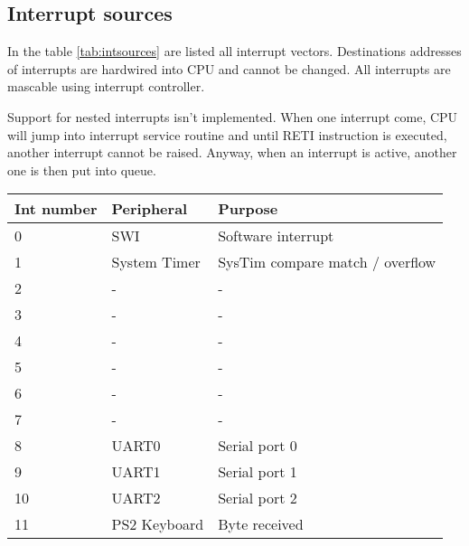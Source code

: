\subsection{Interrupt sources}

In the table \ref{tab:intsources} are listed all interrupt vectors. Destinations
addresses of interrupts are hardwired into CPU and cannot be changed. All
interrupts are mascable using interrupt controller.

Support for nested interrupts isn't implemented. When one interrupt come, CPU
will jump into interrupt service routine and until RETI instruction is executed,
another interrupt cannot be raised. Anyway, when an interrupt is active, another
one is then put into queue.

\begin{table}[h]
    \centering
    \begin{tabular}{|l|l|l|}
        \hline
        \textbf{Int number} & \textbf{Peripheral} & \textbf{Purpose}                \\ \hline
        0                   & SWI                 & Software interrupt              \\ \hline
        1                   & System Timer        & SysTim compare match / overflow \\ \hline
        2                   & -                   & -                               \\ \hline
        3                   & -                   & -                               \\ \hline
        4                   & -                   & -                               \\ \hline
        5                   & -                   & -                               \\ \hline
        6                   & -                   & -                               \\ \hline
        7                   & -                   & -                               \\ \hline
        8                   & UART0               & Serial port 0                   \\ \hline
        9                   & UART1               & Serial port 1                   \\ \hline
        10                  & UART2               & Serial port 2                   \\ \hline
        11                  & PS2 Keyboard        & Byte received                   \\ \hline

\end{tabular}
\end{table}
